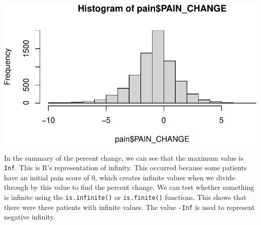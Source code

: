 \documentclass[
  letterpaper,
]{latex/krantz}
\makeatletter
\newenvironment{Shaded}{\begin{snugshade}}{\end{snugshade}}
\newcommand{\CommentTok}[1]{\textcolor[rgb]{0.37,0.37,0.37}{#1}}
\newcommand{\FunctionTok}[1]{\textcolor[rgb]{0.28,0.35,0.67}{#1}}
\newcommand{\NormalTok}[1]{\textcolor[rgb]{0.00,0.23,0.31}{#1}}
\newcommand{\OtherTok}[1]{\textcolor[rgb]{0.00,0.23,0.31}{#1}}
\newcommand{\SpecialCharTok}[1]{\textcolor[rgb]{0.37,0.37,0.37}{#1}}
\newenvironment{kframe}{%
\medskip{}
\setlength{\fboxsep}{.8em}
 \def\at@end@of@kframe{}%
 \ifinner\ifhmode%
  \def\at@end@of@kframe{\end{minipage}}%
  \begin{minipage}{\columnwidth}%
 \fi\fi%
 \def\FrameCommand##1{\hskip\@totalleftmargin \hskip-\fboxsep
 \colorbox{shadecolor}{##1}\hskip-\fboxsep
     \hskip-\linewidth \hskip-\@totalleftmargin \hskip\columnwidth}%
 \MakeFramed {\advance\hsize-\width
   \@totalleftmargin\z@ \linewidth\hsize
   \@setminipage}}%
 {\par\unskip\endMakeFramed%
 \at@end@of@kframe}
\renewenvironment{Shaded}{\begin{kframe}}{\end{kframe}}
\makeatother
\begin{document}
\begin{center}
\includegraphics[width=1\textwidth,height=\textheight]{book/working_data_files_files/figure-pdf/unnamed-chunk-34-1.pdf}
\end{center}

\begin{Shaded}
\end{Shaded}

In the summary of the percent change, we can see that the maximum value
is \texttt{Inf}. This is R's representation of infinity. This occurred
because some patients have an initial pain score of 0, which creates
infinite values when we divide through by this value to find the percent
change. We can test whether something is infinite using the
\texttt{is.infinite()}
or
\texttt{is.finite()}
functions. This shows that there were three patients with infinite
values. The value \texttt{-Inf} is used to represent negative infinity.

\begin{Shaded}
\end{Shaded}
\end{document}
